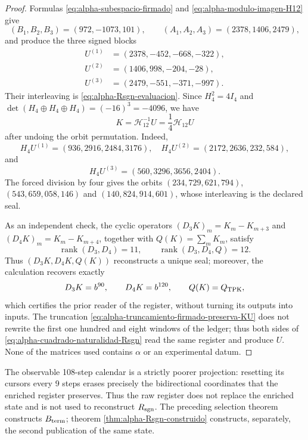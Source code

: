 \begin{proof}
Formulas \eqref{eq:alpha-subespacio-firmado} and
\eqref{eq:alpha-modulo-imagen-H12} give
\[
 (B_1,B_2,B_3)=(972,-1073,101),\qquad
 (A_1,A_2,A_3)=(2378,1406,2479),
\]
and produce the three signed blocks
\[
\begin{aligned}
 U^{(1)}&=(2378,-452,-668,-322),\\
 U^{(2)}&=(1406,998,-204,-28),\\
 U^{(3)}&=(2479,-551,-371,-997).
\end{aligned}
\]
Their interleaving is \eqref{eq:alpha-Rsgn-evaluacion}. Since
\(H_4^2=4I_4\) and
\(\det(H_4\oplus H_4\oplus H_4)=(-16)^3=-4096\), we have
\begin{equation}\label{eq:alpha-Rsgn-inversa}
 K=\mathcal H_{12}^{-1}U
 =\frac14\mathcal H_{12}U
\end{equation}
after undoing the orbit permutation. Indeed,
\[
 H_4U^{(1)}=(936,2916,2484,3176),\quad
 H_4U^{(2)}=(2172,2636,232,584),
\]
and
\[
 H_4U^{(3)}=(560,3296,3656,2404).
\]
The forced division by four gives the orbits
\((234,729,621,794)\), \((543,659,058,146)\) and
\((140,824,914,601)\), whose interleaving is the declared seal.

As an independent check, the cyclic operators
\((D_3K)_m=K_m-K_{m+3}\) and
\((D_4K)_m=K_m-K_{m+4}\), together with \(Q(K)=\sum_mK_m\), satisfy
\begin{equation}\label{eq:alpha-extractor-90-120}
 \operatorname{rank}(D_3,D_4)=11,
 \qquad
 \operatorname{rank}(D_3,D_4,Q)=12.
\end{equation}
Thus \((D_3K,D_4K,Q(K))\) reconstructs a unique seal; moreover, the
calculation recovers exactly
\[
 D_3K=b^{90},\qquad D_4K=b^{120},\qquad Q(K)=Q_{\rm TPK},
\]
which certifies the prior reader of the register, without turning its outputs
into inputs. The truncation
\eqref{eq:alpha-truncamiento-firmado-preserva-KU} does not rewrite the first
one hundred and eight windows of the ledger; thus both sides of
\eqref{eq:alpha-cuadrado-naturalidad-Rsgn} read the same register and
produce \(U\). None of the matrices used contains \(\alpha\) or
an experimental datum.
\end{proof}

The observable 108-step calendar is a strictly poorer
projection: resetting its cursors every 9 steps erases precisely the
bidirectional coordinates that the enriched register preserves. Thus
the raw register does not replace the enriched state and is not used to
reconstruct \(R_{\rm sgn}\). The preceding selection theorem constructs
\(B_{\rm term}\); theorem \ref{thm:alpha-Rsgn-construido} constructs, separately,
the second publication of the same state.

